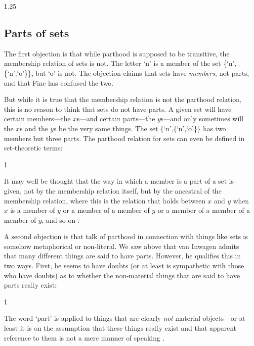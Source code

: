 \documentclass[11pt]{article}
\newenvironment{squote}{%
\begin{spacing}{1}
       	\begin{list}{}{%
\setlength{\labelwidth}{0pt}%
\rightmargin\leftmargin%
}
\item\relax
}{%
\end{list}%
\end{spacing}
}
\begin{document}
\begin{spacing}{1.25}
\subsection{Parts of sets}
\label{sets}
The first objection is that while parthood is supposed to be
transitive, the membership relation of sets is not.  The letter `n' is
a member of the set \{`n',\{`n',`o'\}\}, but `o' is not.  The
objection claims that sets have {\em members}, not parts, and that
Fine has confused the two.

But while it is true that the membership relation is not the parthood
relation, this is no reason to think that sets do not have parts.  A
given set will have certain members---the $x$s---and certain
parts---the $y$s---and only sometimes will the $x$s and the $y$s be
the very same things.  The set \{`n',\{`n',`o'\}\} has two members
but three parts.  The parthood relation for sets can even be defined
in set-theoretic terms:

\begin{squote}
It may well be thought that the way in which a member is a part of a
set is given, not by the membership relation itself, but by the
ancestral of the membership relation, where this is the relation that
holds between $x$ and $y$ when $x$ is a member of $y$ or a member of a
member of $y$ or a member of a member of a member of $y$, and so on
\citep[563]{fine2010}.
\end{squote}

A second objection is that talk of parthood in connection with things
like sets is somehow metaphorical or non-literal.  We saw above that
van Inwagen admits that many different things are said to have parts.
However, he qualifies this in two ways.  First, he seems to have
doubts (or at least is sympathetic with those who have doubts) as to
whether the non-material things that are said to have parts really
exist:

\begin{squote}
The word `part' is applied to things that are clearly \emph{not}
material objects---or at least it is on the assumption that these
things really exist and that apparent reference to them is not a mere
manner of speaking \citep[19]{inwagen1995}.
\end{squote}


\end{spacing}
\end{document}
